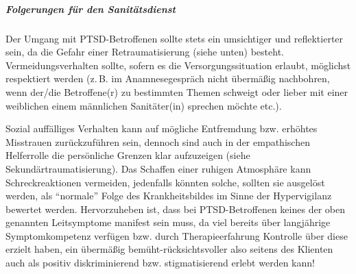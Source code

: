 {\subparagraph{Folgerungen für den Sanitätsdienst} 

\Text
{{\TxBeschreibung}}%
{%
Der Umgang mit
PTSD-Betroffenen sollte stets ein umsichtiger und
reflektierter sein, da die Gefahr einer Retraumatisierung
(siehe unten) besteht. Vermeidungsverhalten sollte, sofern
es die Versorgungssituation erlaubt, möglichst respektiert
werden (z.\,B. im Anamnesegespräch nicht übermäßig
nachbohren, wenn der/die Betroffene(r) zu bestimmten Themen
schweigt oder lieber mit einer weiblichen einem männlichen
Sanitäter(in) sprechen möchte etc.). 

Sozial auffälliges
Verhalten kann auf mögliche Entfremdung bzw. erhöhtes
Misstrauen zurückzuführen sein, dennoch sind auch in der
empathischen Helferrolle die persönliche Grenzen klar
aufzuzeigen (siehe Sekundärtraumatisierung). Das Schaffen
einer ruhigen Atmosphäre kann Schreckreaktionen vermeiden,
jedenfalls könnten solche, sollten sie ausgelöst werden, als
\enquote{normale} Folge des Krankheitsbildes im Sinne der
Hypervigilanz bewertet werden. Hervorzuheben ist, dass bei
PTSD-Betroffenen keines der oben genannten Leitsymptome
manifest sein muss, da viel bereits über langjährige
Symptomkompetenz verfügen bzw. durch Therapieerfahrung
Kontrolle über diese erzielt haben, ein übermäßig
bemüht-rücksichtsvoller also seitens des Klienten auch als
positiv diskriminierend bzw. stigmatisierend erlebt werden
kann!
}%
}
{}
{}
{}
{}

